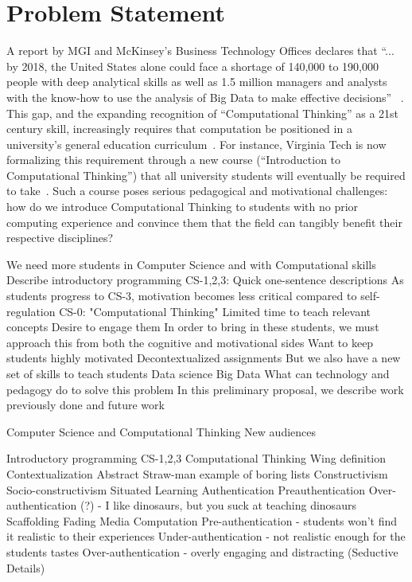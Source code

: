 \section{Problem Statement}

A report by MGI and McKinsey's Business Technology Offices declares that ``... by 2018, the United States alone could face a shortage of 140,000 to 190,000 people with deep analytical skills as well as 1.5 million managers and analysts with the know-how to use the analysis of Big Data to make effective decisions''~\cite{McKinsey} .
This gap, and the expanding recognition of ``Computational Thinking'' as a 21st century skill, increasingly requires that computation be positioned in a university's general education curriculum~\cite{wing2006}.
For instance, Virginia Tech is now formalizing this requirement through a new course (``Introduction to Computational Thinking'') that all university students will eventually be required to take~\cite{vt-vision}.
Such a course poses serious pedagogical and motivational challenges: how do we introduce Computational Thinking to students with no prior computing experience and convince them that the field can tangibly benefit their respective disciplines?



We need more students in Computer Science and with Computational skills
Describe introductory programming
CS-1,2,3: Quick one-sentence descriptions
As students progress to CS-3, motivation becomes less critical compared to self-regulation
CS-0:  "Computational Thinking"
Limited time to teach relevant concepts
Desire to engage them
In order to bring in these students, we must approach this from both the cognitive and motivational sides
Want to keep students highly motivated
Decontextualized assignments
But we also have a new set of skills to teach students
Data science
Big Data
What can technology and pedagogy do to solve this problem
In this preliminary proposal, we describe work previously done and future work


Computer Science and Computational Thinking
New audiences



Introductory programming
	CS-1,2,3
	Computational Thinking
		Wing definition
Contextualization
	Abstract
		Straw-man example of boring lists
	Constructivism
	Socio-constructivism
	Situated Learning
	Authentication
		Preauthentication
		Over-authentication (?) - I like dinosaurs, but you suck at teaching dinosaurs
Scaffolding
	Fading
Media Computation
	Pre-authentication - students won't find it realistic to their experiences
	Under-authentication - not realistic enough for the students tastes
	Over-authentication - overly engaging and distracting (Seductive Details)
	
